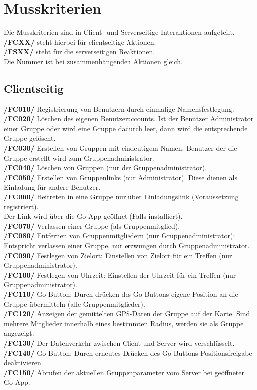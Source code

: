 \newpage
\section{Musskriterien}
Die Musskriterien sind in Client- und Serverseitige Interaktionen aufgeteilt.\\
\textbf{/FCXX/} steht hierbei für clientseitige Aktionen.\\
\textbf{/FSXX/} steht für die serverseitigen Reaktionen.\\
Die Nummer ist bei zusammenhängenden Aktionen gleich.\\
\subsection{Clientseitig}
     \textbf{/FC010/} Registrierung von Benutzern durch einmalige Namensfestlegung.\\
     \textbf{/FC020/} Löschen des eigenen Benutzeraccounts. Ist der Benutzer Administrator einer Gruppe oder wird eine Gruppe dadurch leer, dann wird die entsprechende Gruppe gelöscht.\\
     \textbf{/FC030/} Erstellen von Gruppen mit eindeutigem Namen. Benutzer der die Gruppe erstellt wird zum Gruppenadministrator.\\
     \textbf{/FC040/} Löschen von Gruppen (nur der Gruppenadministrator).\\
     \textbf{/FC050/} Erstellen von Gruppenlinks (nur Administrator). Diese dienen als Einladung für andere Benutzer.\\
     \textbf{/FC060/} Beitreten in eine Gruppe nur über Einladungslink (Voraussetzung registriert).\\
     Der Link wird über die Go-App geöffnet (Falls installiert).\\
     \textbf{/FC070/} Verlassen einer Gruppe (als Gruppenmitglied).\\
     \textbf{/FC080/} Entfernen von Gruppenmitgliedern (nur Gruppenadministrator): Entspricht verlassen einer Gruppe, nur erzwungen durch Gruppenadministrator.\\
     \textbf{/FC090/} Festlegen von Zielort: Einstellen von Zielort für ein Treffen (nur Gruppenadministrator).\\
     \textbf{/FC100/} Festlegen von Uhrzeit: Einstellen der Uhrzeit für ein Treffen (nur Gruppenadministrator).\\
     \textbf{/FC110/} Go-Button: Durch drücken des Go-Buttons eigene Position an die Gruppe übermitteln (alle Gruppenmitglieder).\\
     \textbf{/FC120/} Anzeigen der gemittelten GPS-Daten der Gruppe auf der Karte. Sind mehrere Mitglieder innerhalb eines bestimmten Radius,
     werden sie als Gruppe angezeigt.\\
     \textbf{/FC130/} Der Datenverkehr zwischen Client und Server wird verschlüsselt.\\
     \textbf{/FC140/} Go-Button: Durch erneutes Drücken des Go-Buttons Positionsfreigabe deaktivieren.\\
     \textbf{/FC150/} Abrufen der aktuellen Gruppenparameter vom Server bei geöffneter Go-App.\\
